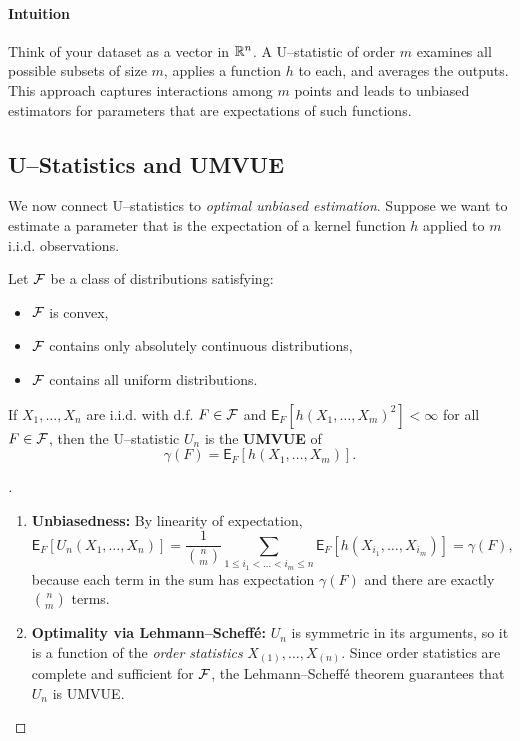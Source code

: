 \paragraph{Intuition}%
Think of your dataset as a vector in \(\mathbb{R}^n\). A U--statistic of order \(m\) examines all possible subsets of size \(m\), applies a function \(h\) to each, and averages the outputs. This approach captures interactions among \(m\) points and leads to unbiased estimators for parameters that are expectations of such functions.

\subsection{U--Statistics and UMVUE}%
\label{sub:u-stats-umvue}

We now connect U--statistics to \emph{optimal unbiased estimation}. Suppose we want to estimate a parameter that is the expectation of a kernel function \(h\) applied to \(m\) i.i.d. observations.

\begin{theo}[]
\label{theo:u-stats}
Let \(\mathcal{F}\) be a class of distributions satisfying:
\begin{itemize}
    \item \(\mathcal{F}\) is convex,
    \item \(\mathcal{F}\) contains only absolutely continuous distributions,
    \item \(\mathcal{F}\) contains all uniform distributions.
\end{itemize}
If \(X_{1}, \dots, X_{n}\) are i.i.d. with d.f. \(F\in \mathcal{F}\) and \(\mathsf{E}_{F}[h(X_1,\dots,X_m)^2]<\infty\) for all \(F\in \mathcal{F}\), then the U--statistic \(U_n\) is the \textbf{UMVUE} of
\[
    \gamma(F) = \mathsf{E}_{F}[h(X_1, \dots, X_m)].
\]
\end{theo}

\begin{proof}[]
\leavevmode
\begin{enumerate}[label=\roman*)]
    \item \textbf{Unbiasedness:} By linearity of expectation,
    \[
        \mathsf{E}_{F}[U_n(X_1,\dots,X_n)] 
        = \frac{1}{\binom{n}{m}} \sum_{1\le i_1<\dots<i_m\le n} \mathsf{E}_{F}[h(X_{i_1},\dots,X_{i_m})]
        = \gamma(F),
    \]
    because each term in the sum has expectation \(\gamma(F)\) and there are exactly \(\binom{n}{m}\) terms.
    
    \item \textbf{Optimality via Lehmann--Scheff\'e:} \(U_n\) is symmetric in its arguments, so it is a function of the \emph{order statistics} \(X_{(1)}, \dots, X_{(n)}\). Since order statistics are complete and sufficient for \(\mathcal{F}\), the Lehmann--Scheff\'e theorem guarantees that \(U_n\) is UMVUE.
\end{enumerate}
\end{proof}

